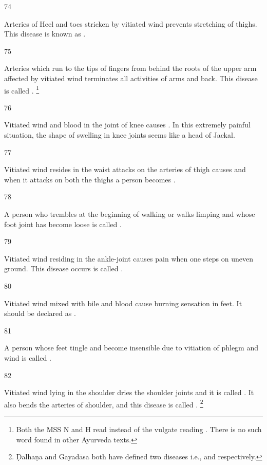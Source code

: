 \begin{translation}
\item[74]

	Arteries of Heel and toes stricken by vitiated wind prevents stretching
	of thighs. This disease is known as .

\item[75]

	Arteries which run to the tips of fingers from behind the roots of the
	upper arm affected by vitiated wind terminates all activities of arms
	and back.  This disease is called . \footnote{Both the MSS N and H read  instead of the
	vulgate reading . There is no such word found in other
	Āyurveda texts.}

\item[76]

	Vitiated wind and blood in the joint of knee causes
	. In this extremely painful
	situation, the shape of swelling in knee joints seems like a head of
	Jackal. 

\item[77]

	Vitiated wind resides in the waist attacks on the arteries of thigh
	causes  and when it attacks on both the thighs a
	person becomes .

\item[78]

	A person who trembles at the beginning of walking or walks limping and
	whose foot joint has become loose is called
	.

\item[79]

	Vitiated wind residing in the ankle-joint causes pain when one steps on
	uneven ground. This disease occurs is called .

\item[80]

	Vitiated wind mixed with bile and blood cause burning sensation in feet.
	It should be declared as .

\item[81]

	A person whose feet tingle and become insensible due to vitiation of
	phlegm and wind is called .

\item[82]

	Vitiated wind lying in the shoulder dries the shoulder joints and it is
	called . It also bends the arteries of shoulder, and this
	disease is called . \footnote{Ḍalhaṇa and Gayadāsa both have
	defined two diseases i.e.,  and  respectively.}


\end{translation}
